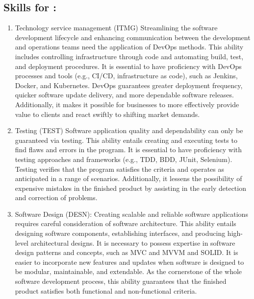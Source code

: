 \documentclass[a4paper, 11pt]{report}
\begin{document}
\subsection{Skills for \majC: \studC}

\begin{enumerate}
	
	\item Technology service management (ITMG)
Streamlining the software development lifecycle and enhancing communication between the development and operations teams need the application of DevOps methods. This ability includes controlling infrastructure through code and automating build, test, and deployment procedures. It is essential to have proficiency with DevOps processes and tools (e.g., CI/CD, infrastructure as code), such as Jenkins, Docker, and Kubernetes. DevOps guarantees greater deployment frequency, quicker software update delivery, and more dependable software releases. Additionally, it makes it possible for businesses to more effectively provide value to clients and react swiftly to shifting market demands.

	\item Testing (TEST)
Software application quality and dependability can only be guaranteed via testing. This ability entails creating and executing tests to find flaws and errors in the program. It is essential to have proficiency with testing approaches and frameworks (e.g., TDD, BDD, JUnit, Selenium). Testing verifies that the program satisfies the criteria and operates as anticipated in a range of scenarios. Additionally, it lessens the possibility of expensive mistakes in the finished product by assisting in the early detection and correction of problems.

	\item Software Design (DESN):
Creating scalable and reliable software applications requires careful consideration of software architecture. This ability entails designing software components, establishing interfaces, and producing high-level architectural designs. It is necessary to possess expertise in software design patterns and concepts, such as MVC and MVVM and SOLID. It is easier to incorporate new features and updates when software is designed to be modular, maintainable, and extendable. As the cornerstone of the whole software development process, this ability guarantees that the finished product satisfies both functional and non-functional criteria.

\end{enumerate}
\end{document}
